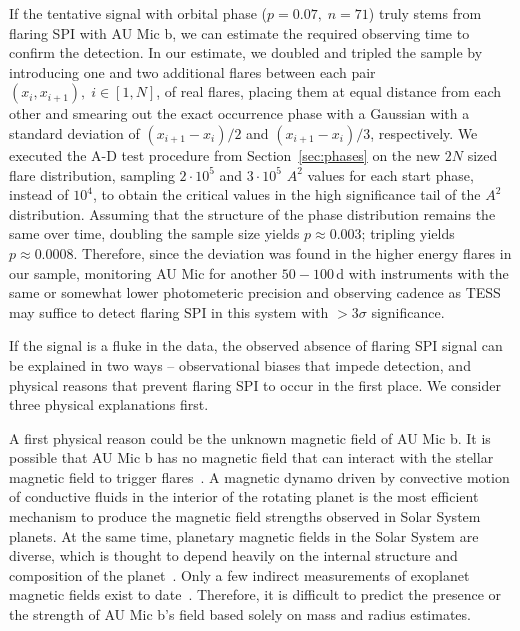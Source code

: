 \documentclass[fleqn,usenatbib]{mnras}%
\begin{document}
If the tentative signal with orbital phase \mbox{($p=0.07,\;n=71$)} truly stems from flaring SPI with AU Mic b, we can estimate the required observing time to confirm the detection. In our estimate, we doubled and tripled the sample by introducing one and two additional flares between each pair $(x_i,x_{i+1}),\;i \in [1,N]$, of real flares, placing them at equal distance from each other and smearing out the exact occurrence phase with a Gaussian with a standard deviation of $(x_{i+1}-x_i)/2$ and $(x_{i+1}-x_i)/3$, respectively. We executed the A-D test procedure from Section~\ref{sec:phases} on the new $2N$ sized flare distribution, sampling $2\cdot 10^5$ and $3\cdot 10^5$ $A^2$ values for each start phase, instead of $10^4$, to obtain the critical values in the high significance tail of the $A^2$ distribution. Assuming that the structure of the phase distribution remains the same over time, doubling the sample size yields $p\approx 0.003$; tripling yields $p\approx0.0008$. Therefore, since the deviation was found in the higher energy flares in our sample, monitoring AU Mic for another $50-100\,$d with instruments with the same or somewhat lower photometeric precision and observing cadence as TESS may suffice to detect flaring SPI in this system with $>3\sigma$ significance.

If the signal is a fluke in the data, the observed absence of flaring SPI signal can be explained in two ways -- observational biases that impede detection, and physical reasons that prevent flaring SPI to occur in the first place. We consider three physical explanations first.

A first physical reason could be the unknown magnetic field of AU Mic b. It is possible that AU Mic b has no magnetic field that can interact with the stellar magnetic field to trigger flares~\citep{lanza2018close-by}. A magnetic dynamo driven by convective motion of conductive fluids in the interior of the rotating planet is the most efficient mechanism to produce the magnetic field strengths observed in Solar System planets. At the same time, planetary magnetic fields in the Solar System are diverse, which is thought to depend heavily on the internal structure and composition of the planet~\citep{stevenson2003planetary, jones2011planetary}. Only a few indirect measurements of exoplanet magnetic fields exist to date~\citep[e.g.][]{cauley2019magnetic, ben-jaffel2021signatures}. Therefore, it is difficult to predict the presence or the strength of AU Mic b's field based solely on mass and radius estimates.
\end{document}
